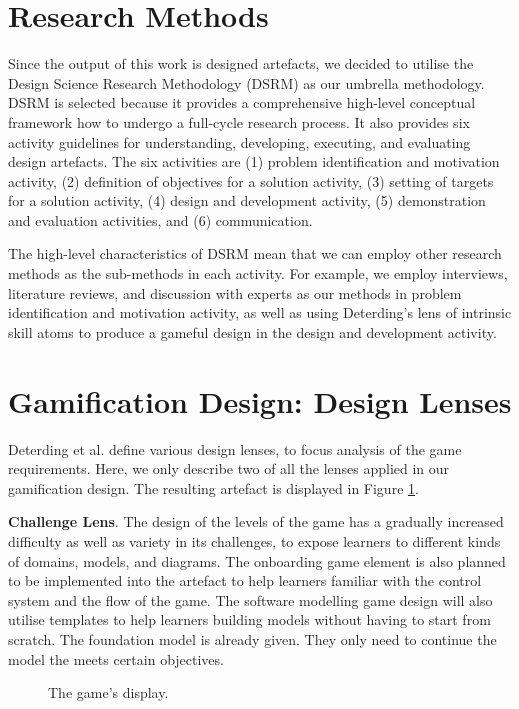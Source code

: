 \documentclass[runningheads,a4paper]{llncs}
\begin{document}
\section{Research Methods}
Since the output of this work is designed artefacts, we decided to utilise the Design Science Research Methodology (DSRM) \cite{peffers2007design} as our umbrella methodology. DSRM is selected because it provides a comprehensive high-level conceptual framework how to undergo a full-cycle research process. It also provides six activity guidelines for understanding, developing, executing, and evaluating design artefacts. The six activities are (1) problem identification and motivation activity, (2) definition of objectives for a solution activity, (3) setting of targets for a solution activity, (4) design and development activity, (5) demonstration and evaluation activities, and (6) communication. 

The high-level characteristics of DSRM mean that we can employ other research methods as the sub-methods in each activity. For example, we employ interviews, literature reviews, and discussion with experts as our methods in problem identification and motivation activity, as well as using Deterding's lens of intrinsic skill atoms \cite{deterding2015lens} to produce a gameful design in the design and development activity.

\section{Gamification Design: Design Lenses}
Deterding et al. \cite{deterding2015lens} define various design lenses, to focus analysis of the game requirements. Here, we only describe two of all the lenses applied in our gamification design. The resulting artefact is displayed in Figure \ref{fig:001}.

\textbf{Challenge Lens}. The design of the levels of the game has a gradually increased difficulty as well as variety in its challenges, to expose learners to different kinds of domains, models, and diagrams. The onboarding game element is also planned to be implemented into the artefact to help learners familiar with the control system and the flow of the game. The software modelling game design will also utilise templates to help learners building models without having to start from scratch. The foundation model is already given. They only need to continue the model the meets certain objectives.

\begin{figure}[t]
\centering
{}
\caption{The game's display.}
\label{fig:001}
\end{figure}
\end{document}

